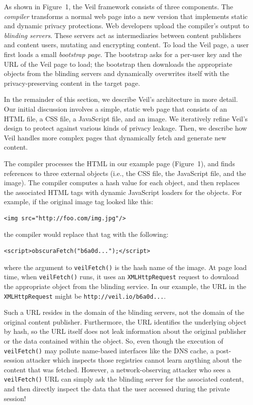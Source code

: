 As shown in Figure~1, the Veil framework  %
consists of three components. The \emph{compiler}
transforms a normal web page into a new version
that implements static and dynamic privacy protections.
Web developers upload the compiler's output to
\emph{blinding servers}. These servers act as
intermediaries between content publishers and
content users, mutating and encrypting content. To load the Veil
page, a user first loads a small \emph{bootstrap page}.
The bootstrap asks for a per-user key and the
URL of the Veil page to load; the bootstrap then
downloads the appropriate objects from the blinding
servers and dynamically overwrites itself with
the privacy-preserving content in the target page.

In the remainder of this section, we describe Veil's
architecture in more detail. Our initial discussion
involves a simple, static web page that consists of
an HTML file, a CSS file, a JavaScript file, and an
image. We iteratively refine Veil's design to protect
against various kinds of privacy leakage. Then, we
describe how Veil handles more complex pages that
dynamically fetch and generate new content.


\label{sec:compiler}
\vspace{-1mm}
The compiler processes the HTML in our example page (Figure~1),
and finds references to three external objects (i.e.,
the CSS file, the JavaScript file, and the image).
The compiler computes a hash value for each object,
and then replaces the associated HTML tags with
dynamic JavaScript loaders for the objects. For
example, if the original image tag looked like this:
\begin{verbatim}
<img src="http://foo.com/img.jpg"/>
\end{verbatim}
\noindent
the compiler would replace that tag with the following:
\noindent
\begin{verbatim}
<script>obscuraFetch("b6a0d...");</script>
\end{verbatim}
where the argument to \texttt{veilFetch()} is the hash
name of the image. At page load time, when
\texttt{veilFetch()} runs, it uses an \texttt{XMLHttpRequest}
request to download the appropriate object from the
blinding service. In our example, the URL in the
\texttt{XMLHttpRequest} might be \texttt{http://veil.io/b6a0d...}.

Such a URL resides in the domain of the blinding
servers, not the domain of the original content
publisher. Furthermore, the URL identifies the underlying
object by hash, so the URL itself does not leak
information about the original publisher or the data
contained within the object. So, even though the
execution of \texttt{veilFetch()} may pollute
name-based interfaces like the DNS cache, a post-session
attacker which inspects those registries
cannot learn anything about the content that was fetched.
However, a network-observing attacker who sees a
\texttt{veilFetch()} URL can simply ask the blinding
server for the associated content, and then directly
inspect the data that the user accessed during the
private session!

